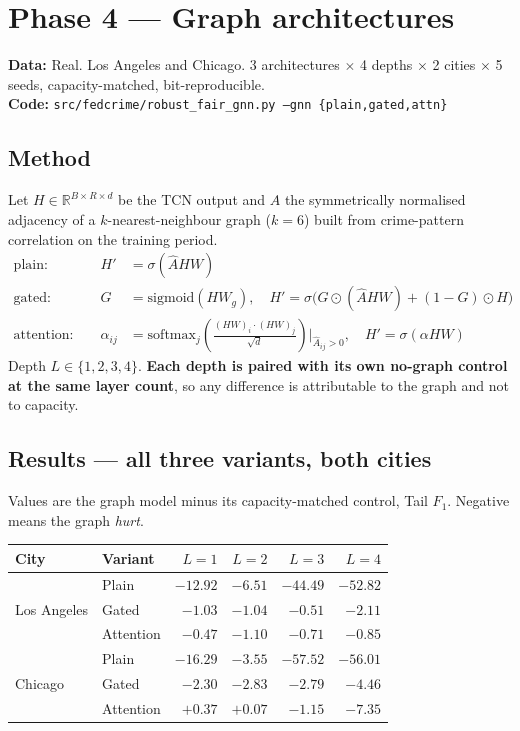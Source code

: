 \documentclass[11pt,a4paper]{article}
\newcommand{\datatag}[2]{%
  \begin{center}\small
  \colorbox{boxbg}{\parbox{0.965\linewidth}{\textbf{Data:} #1 \\ \textbf{Code:} \texttt{#2}}}
  \end{center}}
\begin{document}
\section{Phase 4 --- Graph architectures}\label{sec:graphs}
\datatag{Real. Los Angeles and Chicago. 3 architectures $\times$ 4 depths $\times$ 2 cities $\times$ 5 seeds, capacity-matched, bit-reproducible.}{src/fedcrime/robust\_fair\_gnn.py --gnn \{plain,gated,attn\}}

\subsection{Method}
Let $H \in \mathbb{R}^{B\times R\times d}$ be the TCN output and $\hat{A}$ the
symmetrically normalised adjacency of a $k$-nearest-neighbour graph ($k = 6$)
built from crime-pattern correlation on the training period.
\begin{align}
\text{plain: } && H' &= \sigma(\hat{A} H W) \\
\text{gated: } && G &= \mathrm{sigmoid}(H W_g), \quad H' = \sigma\!\big(G \odot (\hat{A}HW) + (1-G)\odot H\big) \\
\text{attention: } && \alpha_{ij} &= \mathrm{softmax}_j\!\left(\tfrac{(HW)_i \cdot (HW)_j}{\sqrt{d}}\right)\Big|_{\hat A_{ij}>0}, \quad H' = \sigma(\alpha H W)
\end{align}
Depth $L \in \{1,2,3,4\}$. \textbf{Each depth is paired with its own no-graph
control at the same layer count}, so any difference is attributable to the graph
and not to capacity.

\subsection{Results --- all three variants, both cities}
Values are the graph model minus its capacity-matched control, Tail $F_1$.
Negative means the graph \emph{hurt}.
\begin{center}
\begin{tabular}{llrrrr}
\toprule
City & Variant & $L{=}1$ & $L{=}2$ & $L{=}3$ & $L{=}4$ \\
\midrule
\multirow{3}{*}{Los Angeles}
 & Plain     & $-12.92$ & $-6.51$ & $-44.49$ & $-52.82$ \\
 & Gated     & $-1.03$  & $-1.04$ & $-0.51$  & $-2.11$  \\
 & Attention & $-0.47$  & $-1.10$ & $-0.71$  & $-0.85$  \\
\midrule
\multirow{3}{*}{Chicago}
 & Plain     & $-16.29$ & $-3.55$ & $-57.52$ & $-56.01$ \\
 & Gated     & $-2.30$  & $-2.83$ & $-2.79$  & $-4.46$  \\
 & Attention & $+0.37$  & $+0.07$ & $-1.15$  & $-7.35$  \\
\bottomrule
\end{tabular}
\end{center}
\end{document}
